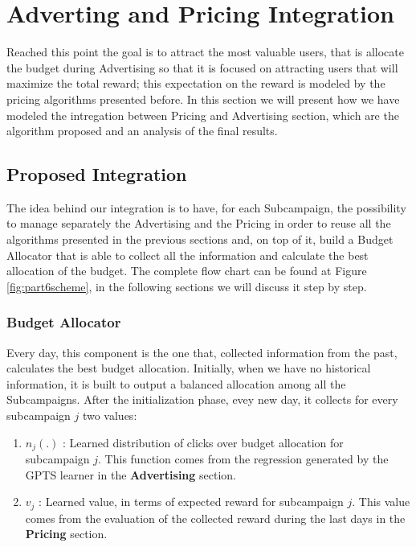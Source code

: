 \chapter{Adverting and Pricing Integration}

Reached this point the goal is to attract the most valuable users, that is allocate the budget during Advertising so that it is focused on attracting users that will maximize the total reward; this expectation on the reward is modeled by the pricing algorithms presented before. In this section we will present how we have modeled the intregation between Pricing and Advertising section, which are the algorithm proposed and an analysis of the final results.

\section{Proposed Integration}
The idea behind our integration is to have, for each Subcampaign, the possibility to manage separately the Advertising and the Pricing in order to reuse all the algorithms presented in the previous sections and, on top of it, build a Budget Allocator that is able to collect all the information and calculate the best allocation of the budget. The complete flow chart can be found at Figure \ref{fig:part6scheme}, in the following sections we will discuss it step by step.

    \subsection{Budget Allocator}
    Every day, this component is the one that, collected information from the past, calculates the best budget allocation. Initially, when we have no historical information, it is built to output a balanced allocation among all the Subcampaigns. After the initialization phase, evey new day, it collects for every subcampaign $ j $ two values:
    
    \begin{enumerate}
        \item $ n_j (.) $ : Learned distribution of clicks over budget allocation for subcampaign $ j $. This function comes from the regression generated by the GPTS learner in the   \textbf{Advertising} section.
        \item $ v_j $ : Learned value, in terms of expected reward for subcampaign $ j $. This value comes from the evaluation of the collected reward during the last days in the \textbf{Pricing} section.
    \end{enumerate} 


